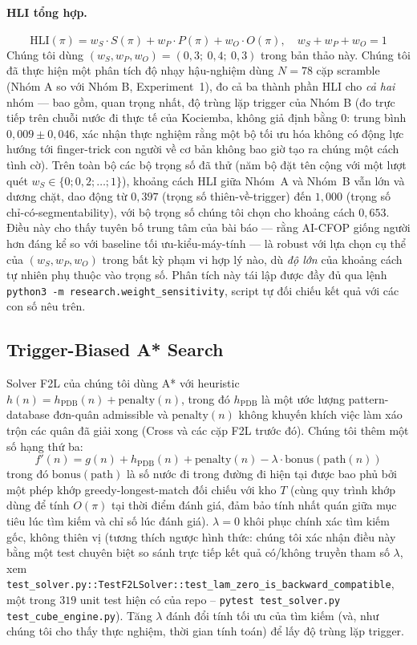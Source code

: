 \documentclass[10pt,conference]{article}
\begin{document}
\paragraph{HLI tổng hợp.}
$$\mathrm{HLI}(\pi) = w_S \cdot S(\pi) + w_P \cdot P(\pi) + w_O \cdot O(\pi), \quad w_S{+}w_P{+}w_O = 1$$
Chúng tôi dùng $(w_S, w_P, w_O) = (0,3;\ 0,4;\ 0,3)$ trong bản thảo
này. Chúng tôi đã thực hiện một phân tích độ nhạy hậu-nghiệm dùng
$N=78$ cặp scramble (Nhóm A so với Nhóm B, Experiment~1), đo cả ba
thành phần HLI cho \emph{cả hai} nhóm — bao gồm, quan trọng nhất, độ
trùng lặp trigger của Nhóm B (đo trực tiếp trên chuỗi nước đi thực tế
của Kociemba, không giả định bằng 0: trung bình $0,009 \pm 0,046$, xác
nhận thực nghiệm rằng một bộ tối ưu hóa không có động lực hướng tới
finger-trick con người về cơ bản không bao giờ tạo ra chúng một cách
tình cờ). Trên toàn bộ các bộ trọng số đã thử (năm bộ đặt tên cộng với
một lượt quét $w_S \in \{0; 0,2; \ldots; 1\}$), khoảng cách HLI giữa
Nhóm~A và Nhóm~B vẫn lớn và dương chặt, dao động từ $0,397$ (trọng số
thiên-về-trigger) đến $1,000$ (trọng số chỉ-có-segmentability), với bộ
trọng số chúng tôi chọn cho khoảng cách $0,653$. Điều này cho thấy
tuyên bố trung tâm của bài báo — rằng AI-CFOP giống người hơn đáng kể
so với baseline tối ưu-kiểu-máy-tính — là robust với lựa chọn cụ thể
của $(w_S,w_P,w_O)$ trong bất kỳ phạm vi hợp lý nào, dù \emph{độ lớn}
của khoảng cách tự nhiên phụ thuộc vào trọng số. Phân tích này tái lập
được đầy đủ qua lệnh \texttt{python3 -m research.weight\_sensitivity},
script tự đối chiếu kết quả với các con số nêu trên.

\subsection{Trigger-Biased A* Search}

Solver F2L của chúng tôi dùng A* với heuristic $h(n) = h_{\mathrm{PDB}}(n)
+ \mathrm{penalty}(n)$, trong đó $h_{\mathrm{PDB}}$ là một ước lượng
pattern-database đơn-quân admissible và $\mathrm{penalty}(n)$ không
khuyến khích việc làm xáo trộn các quân đã giải xong (Cross và các cặp
F2L trước đó). Chúng tôi thêm một số hạng thứ ba:
$$f'(n) = g(n) + h_{\mathrm{PDB}}(n) + \mathrm{penalty}(n) - \lambda \cdot \mathrm{bonus}(\mathrm{path}(n))$$
trong đó $\mathrm{bonus}(\mathrm{path})$ là số nước đi trong đường đi
hiện tại được bao phủ bởi một phép khớp greedy-longest-match đối chiếu
với kho $T$ (cùng quy trình khớp dùng để tính $O(\pi)$ tại thời điểm
đánh giá, đảm bảo tính nhất quán giữa mục tiêu lúc tìm kiếm và chỉ số
lúc đánh giá). $\lambda=0$ khôi phục chính xác tìm kiếm gốc, không
thiên vị (tương thích ngược hình thức: chúng tôi xác nhận điều này
bằng một test chuyên biệt so sánh trực tiếp kết quả có/không truyền
tham số $\lambda$, xem
\texttt{test\_solver.py::TestF2LSolver::test\_lam\_zero\_is\_backward\_compatible},
một trong $319$ unit test hiện có của repo --
\texttt{pytest test\_solver.py test\_cube\_engine.py}). Tăng
$\lambda$ đánh đổi tính tối ưu của tìm kiếm (và, như chúng tôi cho thấy
thực nghiệm, thời gian tính toán) để lấy độ trùng lặp trigger.
\end{document}

